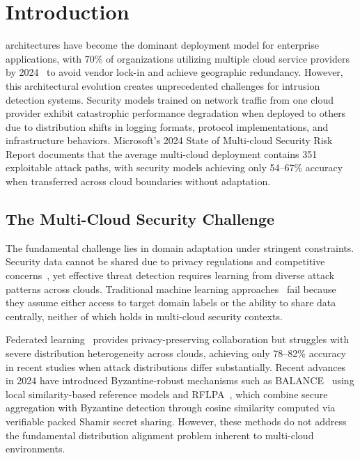 \documentclass{ieeeaccess}
\theoremstyle{plain}
\theoremstyle{definition}
\theoremstyle{remark}
\begin{document}
\titlepgskip=-21pt

\maketitle

\section{Introduction}
\label{sec:introduction}

 architectures have become the dominant deployment model for enterprise applications, with 70\% of organizations utilizing multiple cloud service providers by 2024~\cite{flexera2024} to avoid vendor lock-in and achieve geographic redundancy. However, this architectural evolution creates unprecedented challenges for intrusion detection systems. Security models trained on network traffic from one cloud provider exhibit catastrophic performance degradation when deployed to others due to distribution shifts in logging formats, protocol implementations, and infrastructure behaviors. Microsoft's 2024 State of Multi-cloud Security Risk Report documents that the average multi-cloud deployment contains 351 exploitable attack paths, with security models achieving only 54--67\% accuracy when transferred across cloud boundaries without adaptation.

\subsection{The Multi-Cloud Security Challenge}

The fundamental challenge lies in domain adaptation under stringent constraints. Security data cannot be shared due to privacy regulations and competitive concerns~\cite{mothukuri2021}, yet effective threat detection requires learning from diverse attack patterns across clouds. Traditional machine learning approaches~\cite{pan2009,csurka2017} fail because they assume either access to target domain labels or the ability to share data centrally, neither of which holds in multi-cloud security contexts.

Federated learning~\cite{mcmahan2017,kairouz2021} provides privacy-preserving collaboration but struggles with severe distribution heterogeneity across clouds, achieving only 78--82\% accuracy in recent studies when attack distributions differ substantially. Recent advances in 2024 have introduced Byzantine-robust mechanisms such as BALANCE~\cite{fang2024} using local similarity-based reference models and RFLPA~\cite{mai2024}, which combine secure aggregation with Byzantine detection through cosine similarity computed via verifiable packed Shamir secret sharing. However, these methods do not address the fundamental distribution alignment problem inherent to multi-cloud environments.
\end{document}
